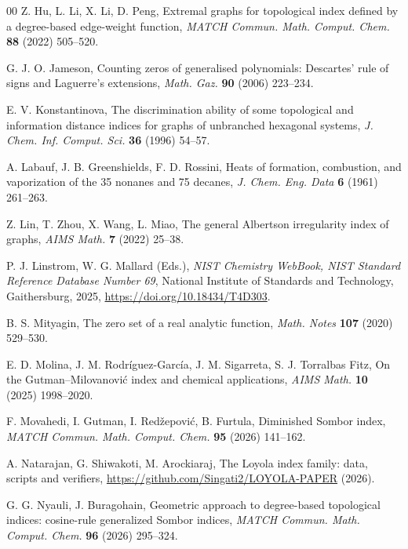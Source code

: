 \documentclass[a5paper, 10pt]{article}
\theoremstyle{plain}
\theoremstyle{remark}
\theoremstyle{definition}
\begin{document}
\begin{thebibliography}{00}
   Z. Hu, L. Li, X. Li, D. Peng, Extremal graphs
  for topological index defined by a degree-based edge-weight
  function, \textit{MATCH Commun. Math. Comput. Chem.\/} \textbf{88}
  (2022) 505--520.

   G. J. O. Jameson, Counting zeros of generalised
  polynomials: Descartes' rule of signs and Laguerre's extensions,
  \textit{Math. Gaz.\/} \textbf{90} (2006) 223--234.

   E. V. Konstantinova, The
  discrimination ability of some topological and information distance indices
  for graphs of unbranched hexagonal systems, \textit{J. Chem. Inf. Comput.
  Sci.\/} \textbf{36} (1996) 54--57.

   A. Labauf, J. B. Greenshields,
  F. D. Rossini, Heats of formation, combustion, and vaporization of the
  35 nonanes and 75 decanes, \textit{J. Chem. Eng. Data\/} \textbf{6}
  (1961) 261--263.

   Z. Lin, T. Zhou, X. Wang, L. Miao, The general
  Albertson irregularity index of graphs, \textit{AIMS Math.\/} \textbf{7}
  (2022) 25--38.

   P. J. Linstrom, W. G. Mallard (Eds.), \textit{NIST
  Chemistry WebBook, NIST Standard Reference Database Number 69\/}, National
  Institute of Standards and Technology, Gaithersburg, 2025,
  \url{https://doi.org/10.18434/T4D303}.

   B. S. Mityagin, The zero set of a real analytic
  function, \textit{Math. Notes\/} \textbf{107} (2020) 529--530.

   E. D. Molina, J. M.
  Rodr\'iguez-Garc\'ia, J. M. Sigarreta, S. J. Torralbas Fitz, On the
  Gutman--Milovanovi\'c index and chemical applications, \textit{AIMS
  Math.\/} \textbf{10} (2025) 1998--2020.

   F. Movahedi, I. Gutman, I.
  Red\v{z}epovi\'c, B. Furtula, Diminished Sombor index, \textit{MATCH Commun.
  Math. Comput. Chem.\/} \textbf{95} (2026) 141--162.

   A. Natarajan, G. Shiwakoti, M. Arockiaraj,
  The Loyola index family: data, scripts and verifiers,
  \url{https://github.com/Singati2/LOYOLA-PAPER} (2026).

   G. G. Nyauli, J. Buragohain, Geometric
  approach to degree-based topological indices: cosine-rule generalized
  Sombor indices, \textit{MATCH Commun. Math. Comput. Chem.\/} \textbf{96}
  (2026) 295--324.


\end{thebibliography}
\end{document}
